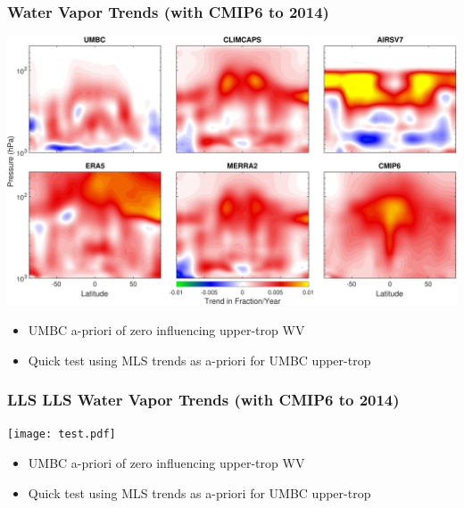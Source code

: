 \documentclass[10pt,t]{beamer}
\begin{document}
\begin{frame}
\frametitle{Water Vapor Trends (with CMIP6 to 2014)}  
\vspace{-0.15in}
\begin{center}
\includegraphics[width=\linewidth]{SunClimate2022/zonal_wvrates_50to1000mbar_cmip6.pdf}
\end{center}

\small
\begin{itemize}
\item UMBC a-priori of zero influencing upper-trop WV
\item Quick test using MLS trends as a-priori for UMBC upper-trop
\end{itemize}
\end{frame}

\begin{frame}
\frametitle{LLS LLS Water Vapor Trends (with CMIP6 to 2014)}  
\vspace{-0.15in}
\begin{center}
\texttt{[image: test.pdf]}
\end{center}

\small
\begin{itemize}
\item UMBC a-priori of zero influencing upper-trop WV
\item Quick test using MLS trends as a-priori for UMBC upper-trop
\end{itemize}
\end{frame}
\end{document}
